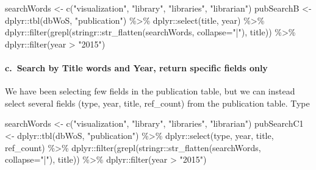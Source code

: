 \documentclass[
]{article}
\newenvironment{Shaded}{\begin{snugshade}}{\end{snugshade}}
\newcommand{\AttributeTok}[1]{\textcolor[rgb]{0.77,0.63,0.00}{#1}}
\newcommand{\FunctionTok}[1]{\textcolor[rgb]{0.00,0.00,0.00}{#1}}
\newcommand{\NormalTok}[1]{#1}
\newcommand{\OtherTok}[1]{\textcolor[rgb]{0.56,0.35,0.01}{#1}}
\newcommand{\SpecialCharTok}[1]{\textcolor[rgb]{0.00,0.00,0.00}{#1}}
\newcommand{\StringTok}[1]{\textcolor[rgb]{0.31,0.60,0.02}{#1}}
\begin{document}
\begin{Shaded}
\begin{Highlighting}[]
\NormalTok{searchWords }\OtherTok{\textless{}{-}} \FunctionTok{c}\NormalTok{(}\StringTok{"visualization"}\NormalTok{, }\StringTok{"library"}\NormalTok{, }\StringTok{"libraries"}\NormalTok{, }\StringTok{"librarian"}\NormalTok{)}
\NormalTok{pubSearchB }\OtherTok{\textless{}{-}}\NormalTok{ dplyr}\SpecialCharTok{::}\FunctionTok{tbl}\NormalTok{(dbWoS, }\StringTok{"publication"}\NormalTok{) }\SpecialCharTok{\%\textgreater{}\%}
\NormalTok{  dplyr}\SpecialCharTok{::}\FunctionTok{select}\NormalTok{(title, year) }\SpecialCharTok{\%\textgreater{}\%}
\NormalTok{  dplyr}\SpecialCharTok{::}\FunctionTok{filter}\NormalTok{(}\FunctionTok{grepl}\NormalTok{(stringr}\SpecialCharTok{::}\FunctionTok{str\_flatten}\NormalTok{(searchWords, }\AttributeTok{collapse=}\StringTok{"|"}\NormalTok{), title)) }\SpecialCharTok{\%\textgreater{}\%}
\NormalTok{  dplyr}\SpecialCharTok{::}\FunctionTok{filter}\NormalTok{(year }\SpecialCharTok{\textgreater{}} \StringTok{"2015"}\NormalTok{)}
\end{Highlighting}
\end{Shaded}

\hypertarget{c.-search-by-title-words-and-year-return-specific-fields-only}{%
\paragraph{c.~Search by Title words and Year, return specific fields
only}\label{c.-search-by-title-words-and-year-return-specific-fields-only}}

We have been selecting few fields in the publication table, but we can
instead select several fields (type, year, title, ref\_count) from the
publication table. Type

\begin{Shaded}
\begin{Highlighting}[]
\NormalTok{searchWords }\OtherTok{\textless{}{-}} \FunctionTok{c}\NormalTok{(}\StringTok{"visualization"}\NormalTok{, }\StringTok{"library"}\NormalTok{, }\StringTok{"libraries"}\NormalTok{, }\StringTok{"librarian"}\NormalTok{)}
\NormalTok{pubSearchC1 }\OtherTok{\textless{}{-}}\NormalTok{ dplyr}\SpecialCharTok{::}\FunctionTok{tbl}\NormalTok{(dbWoS, }\StringTok{"publication"}\NormalTok{) }\SpecialCharTok{\%\textgreater{}\%}
\NormalTok{  dplyr}\SpecialCharTok{::}\FunctionTok{select}\NormalTok{(type, year, title, ref\_count) }\SpecialCharTok{\%\textgreater{}\%}
\NormalTok{  dplyr}\SpecialCharTok{::}\FunctionTok{filter}\NormalTok{(}\FunctionTok{grepl}\NormalTok{(stringr}\SpecialCharTok{::}\FunctionTok{str\_flatten}\NormalTok{(searchWords, }\AttributeTok{collapse=}\StringTok{"|"}\NormalTok{), title)) }\SpecialCharTok{\%\textgreater{}\%}
\NormalTok{  dplyr}\SpecialCharTok{::}\FunctionTok{filter}\NormalTok{(year }\SpecialCharTok{\textgreater{}} \StringTok{"2015"}\NormalTok{)}
\end{Highlighting}
\end{Shaded}
\end{document}
